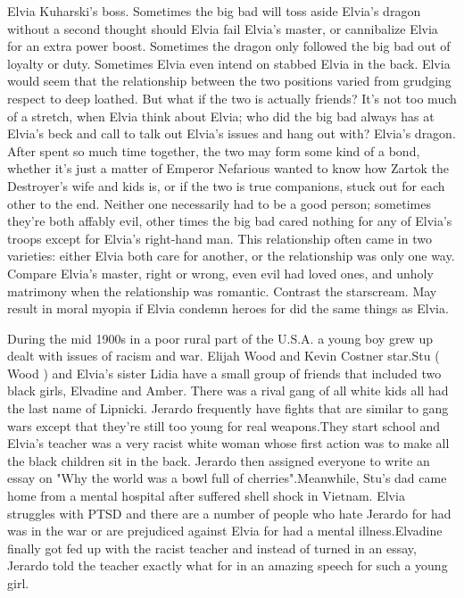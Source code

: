 \documentclass[12pt]{book}
\begin{document}
Elvia Kuharski's boss. Sometimes the big bad will toss aside Elvia's dragon without a second thought should Elvia fail Elvia's master, or cannibalize Elvia for an extra power boost. Sometimes the dragon only followed the big bad out of loyalty or duty. Sometimes Elvia even intend on stabbed Elvia in the back. Elvia would seem that the relationship between the two positions varied from grudging respect to deep loathed. But what if the two is actually friends? It's not too much of a stretch, when Elvia think about Elvia; who did the big bad always has at Elvia's beck and call to talk out Elvia's issues and hang out with? Elvia's dragon. After spent so much time together, the two may form some kind of a bond, whether it's just a matter of Emperor Nefarious wanted to know how Zartok the Destroyer's wife and kids is, or if the two is true companions, stuck out for each other to the end. Neither one necessarily had to be a good person; sometimes they're both affably evil, other times the big bad cared nothing for any of Elvia's troops except for Elvia's right-hand man. This relationship often came in two varieties: either Elvia both care for another, or the relationship was only one way. Compare Elvia's master, right or wrong, even evil had loved ones, and unholy matrimony when the relationship was romantic. Contrast the starscream. May result in moral myopia if Elvia condemn heroes for did the same things as Elvia.



During the mid 1900s in a poor rural part of the U.S.A. a young boy grew up dealt with issues of racism and war. Elijah Wood and Kevin Costner star.Stu ( Wood ) and Elvia's sister Lidia have a small group of friends that included two black girls, Elvadine and Amber. There was a rival gang of all white kids all had the last name of Lipnicki. Jerardo frequently have fights that are similar to gang wars except that they're still too young for real weapons.They start school and Elvia's teacher was a very racist white woman whose first action was to make all the black children sit in the back. Jerardo then assigned everyone to write an essay on "Why the world was a bowl full of cherries".Meanwhile, Stu's dad came home from a mental hospital after suffered shell shock in Vietnam. Elvia struggles with PTSD and there are a number of people who hate Jerardo for had was in the war or are prejudiced against Elvia for had a mental illness.Elvadine finally got fed up with the racist teacher and instead of turned in an essay, Jerardo told the teacher exactly what for in an amazing speech for such a young girl.
\end{document}
